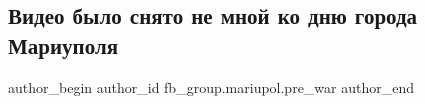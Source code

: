  
 
 
 
 

\subsection{Видео было снято не мной ко дню города Мариуполя}
\label{sec:24_02_2023.fb.fb_group.mariupol.pre_war.2.video_bilo_snyato_ne}

\ifcmt
 author_begin
   author_id fb_group.mariupol.pre_war
 author_end
\fi
